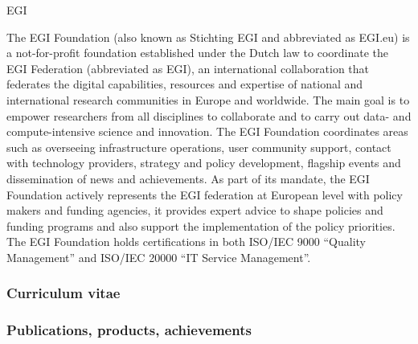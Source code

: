 \begin{sitedescription}{EGI}


The EGI Foundation (also known as Stichting EGI and abbreviated as EGI.eu) 
is a not-for-profit foundation established under the Dutch law to coordinate 
the EGI Federation (abbreviated as EGI), an international collaboration that 
federates the digital capabilities, resources and expertise of national and 
international research communities in Europe and worldwide. 
The main goal is to empower researchers from all disciplines to collaborate 
and to carry out data- and compute-intensive science and innovation. 
The EGI Foundation coordinates areas such as overseeing infrastructure operations, 
user community support, contact with technology providers, strategy and policy 
development, flagship events and dissemination of news and achievements. 
As part of its mandate, the EGI Foundation actively represents the EGI federation 
at European level with policy makers and funding agencies, it provides expert 
advice to shape policies and funding programs and also support the implementation 
of the policy priorities. 
The EGI Foundation holds certifications in both ISO/IEC 9000 “Quality Management” 
and ISO/IEC 20000 “IT Service Management”. 

%

\subsubsection*{Curriculum vitae}


%
%
%


\subsubsection*{Publications, products, achievements}


\end{sitedescription}
